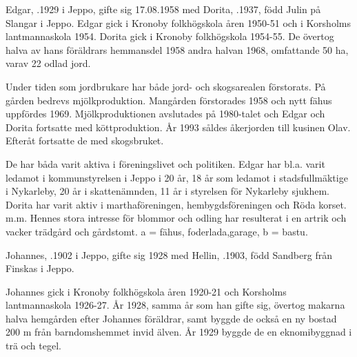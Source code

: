 
%
Edgar, .1929 i Jeppo, gifte sig 17.08.1958 med Dorita, .1937, född Julin på Slangar i Jeppo.
Edgar gick i Kronoby folkhögskola åren 1950-51 och i Korsholms lantmannaskola 1954. Dorita gick i Kronoby folkhögskola 1954-55. De övertog halva av hans föräldrars hemmansdel 1958 andra halvan 1968, omfattande 50 ha, varav 22 odlad jord.

Under tiden som jordbrukare har både jord- och skogsarealen förstorats. På gården bedrevs mjölkproduktion. Mangården förstorades 1958 och nytt fähus uppfördes 1969. Mjölkproduktionen avslutades på 1980-talet och Edgar och Dorita fortsatte med köttproduktion. År 1993 såldes åkerjorden till kusinen Olav. Efteråt fortsatte de med skogsbruket.


De har båda varit aktiva i föreningslivet och politiken. Edgar har bl.a. varit ledamot i kommunstyrelsen i Jeppo i 20 år, 18 år som ledamot i stadsfullmäktige i Nykarleby, 20 år i skattenämnden, 11 år i styrelsen för Nykarleby sjukhem. Dorita har varit aktiv i marthaföreningen, hembygdsföreningen och Röda korset. m.m. Hennes stora intresse för blommor och odling har resulterat i en artrik och vacker trädgård och gårdstomt. a = fähus, foderlada,garage, b = bastu.


%
Johannes, .1902 i Jeppo, gifte sig 1928 med Hellin, .1903, född Sandberg från Finskas i Jeppo.
\begin{jhchildren}
  \item {}
  \item {}
  \item {}
\end{jhchildren}
Johannes gick i Kronoby folkhögskola åren 1920-21 och Korsholms lantmannaskola 1926-27. År 1928, samma år som han gifte sig, övertog makarna halva hemgården efter Johannes föräldrar, samt byggde de också en ny bostad 200 m från barndomshemmet invid älven. År 1929 byggde de en eknomibyggnad i trä och tegel.

